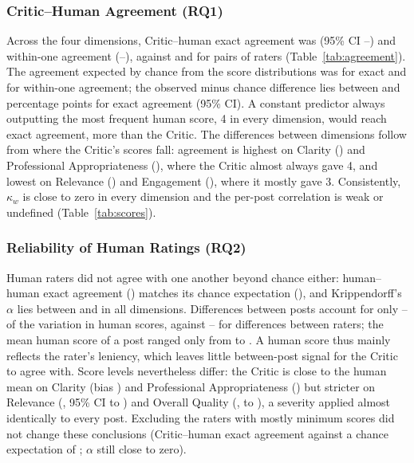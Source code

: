 \documentclass[a4paper,twoside]{article}
\begin{document}
\subsubsection{Critic--Human Agreement (RQ1)}

Across the four dimensions, Critic--human exact agreement was \CHexAll{} (95\% CI \CHexLo{}--\CHexHi{}) and within-one agreement \CHwAll{} (\CHwLo{}--\CHwHi{}), against \HHexAll{} and \HHwAll{} for pairs of raters (Table~\ref{tab:agreement}). The agreement expected by chance from the score distributions was \CHchanceExAll{} for exact and \CHchanceWAll{} for within-one agreement; the observed minus chance difference lies between \ChanceDiffExLo{} and \ChanceDiffExHi{} percentage points for exact agreement (95\% CI). A constant predictor always outputting the most frequent human score, 4 in every dimension, would reach \ConstExAll{} exact agreement, more than the Critic. The differences between dimensions follow from where the Critic's scores fall: agreement is highest on Clarity (\CHexCla{}) and Professional Appropriateness (\CHexPro{}), where the Critic almost always gave 4, and lowest on Relevance (\CHexRel{}) and Engagement (\CHexEng{}), where it mostly gave 3. Consistently, $\kappa_w$ is close to zero in every dimension and the per-post correlation is weak or undefined (Table~\ref{tab:scores}).

\subsubsection{Reliability of Human Ratings (RQ2)}

Human raters did not agree with one another beyond chance either: human--human exact agreement (\HHexAll{}) matches its chance expectation (\HHchanceExAll{}), and Krippendorff's $\alpha$ lies between \AlphaMin{} and \AlphaMax{} in all dimensions. Differences between posts account for only \VarPostMin{}--\VarPostMax{} of the variation in human scores, against \VarRaterMin{}--\VarRaterMax{} for differences between raters; the mean human score of a post ranged only from \PostMeanMin{} to \PostMeanMax{}. A human score thus mainly reflects the rater's leniency, which leaves little between-post signal for the Critic to agree with. Score levels nevertheless differ: the Critic is close to the human mean on Clarity (bias \BiasCla{}) and Professional Appropriateness (\BiasPro{}) but stricter on Relevance (\BiasRel{}, 95\% CI \BiasLoRel{} to \BiasHiRel{}) and Overall Quality (\BiasOve{}, \BiasLoOve{} to \BiasHiOve{}), a severity applied almost identically to every post. Excluding the \FlaggedN{} raters with mostly minimum scores did not change these conclusions (Critic--human exact agreement \SensCHexAll{} against a chance expectation of \SensChanceExAll{}; $\alpha$ still close to zero).
\end{document}
